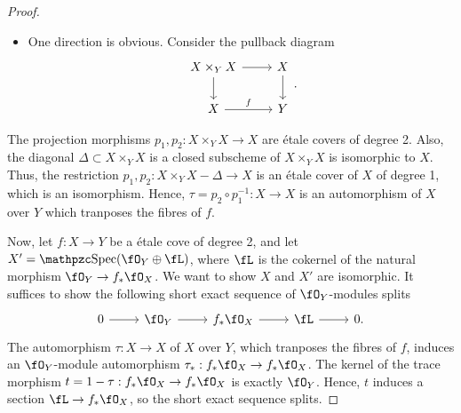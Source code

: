 \documentclass[a4paper]{article}
\begin{document}
\begin{enumerate} [label=\textbf{\arabic*.}, leftmargin=0em]
\begin{proof}
\begin{itemize} [leftmargin=0cm]
            \item[(c)] One direction is obvious.
                  Consider the pullback diagram
                  \[ \begin{tikzcd}
                      X \times_Y X \arrow[d] \arrow[r] & X \arrow[d] \\
                      X \arrow[r, "f"]                 & Y
                    \end{tikzcd}. \]
          \end{itemize}
          The projection morphisms $p_1, p_2 : X \times_Y X \to X$ are étale covers of degree 2.
          Also, the diagonal $\Delta \subset X \times_Y X$ is a closed subscheme of $X \times_Y X$ is isomorphic to $X$.
          Thus, the restriction $p_1, p_2 : X \times_Y X - \Delta \to X$ is an étale cover of $X$ of degree 1, which is an isomorphism.
          Hence, $\tau = p_2 \circ p_1^{-1} : X \to X$ is an automorphism of $X$ over $Y$ which tranposes the fibres of $f$.
          \filbreak

          Now, let $f : X \to Y$ be a étale cove of degree 2, and let $X' = \rSpec(\fO_Y \oplus \fL)$, where $\fL$ is the cokernel of the natural morphism $\fO_Y \to f_*\fO_X$.
          We want to show $X$ and $X'$ are isomorphic.
          It suffices to show the following short exact sequence of $\fO_Y$-modules splits
          \[ \begin{tikzcd}
              0 \arrow[r] & \fO_Y \arrow[r] & f_*\fO_X \arrow[r] & \fL \arrow[r] & 0.
            \end{tikzcd} \]
          The automorphism $\tau : X \to X$ of $X$ over $Y$, which tranposes the fibres of $f$, induces an $\fO_Y$-module automorphism $\tau_* : f_*\fO_X \to f_*\fO_X$.
          The kernel of the trace morphism $t = 1 - \tau : f_*\fO_X \to f_*\fO_X$ is exactly $\fO_Y$.
          Hence, $t$ induces a section $\fL \to f_*\fO_X$, so the short exact sequence splits.
        \end{proof}

\end{enumerate}
\end{document}
